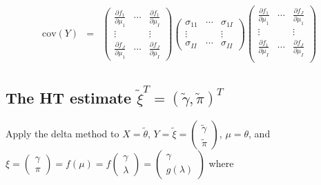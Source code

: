 \documentclass[11pt]{article}
\begin{document}
\begin{eqnarray}
\mbox{cov}(Y) & = & 
        \left( \begin{array}{lll}
            \frac{\partial f_1}{\partial \mu_1} & \cdots 
            & \frac{\partial f_1}{\partial \mu_I}\\
            \vdots & & \vdots\\
            \frac{\partial f_J}{\partial \mu_1} & \cdots
            & \frac{\partial f_J}{\partial \mu_I}
          \end{array} \right)
        \left( \begin{array} {lll}
            \sigma_{11} & \cdots & \sigma_{1I}\\
            \vdots & & \vdots\\
            \sigma_{II} & \cdots & \sigma_{II}
          \end{array} \right)
        \left( \begin{array} {lll}
            \frac{\partial f_1}{\partial \mu_1} & \cdots
            & \frac{\partial f_J}{\partial \mu_1}\\
            \vdots & & \vdots\\
            \frac{\partial f_1}{\partial \mu_I} & \cdots
            & \frac{\partial f_J}{\partial \mu_I}\\
          \end{array} \right)
      \end{eqnarray}

\subsection{The HT estimate $\tilde{\xi}^T = (\tilde{\gamma},
  \tilde{\pi})^T$ }
\label{sec:HT}

Apply the delta method to $X = \tilde{\theta}$, 
$Y = \tilde{\xi} = \begin{pmatrix}  \tilde{\gamma}\\
  \tilde{\pi}  \end{pmatrix}$, 
$\mu = \theta$,
and $\xi = \begin{pmatrix}  \gamma\\
  \pi  \end{pmatrix} = f(\mu) 
= f \begin{pmatrix}  \gamma\\
  \lambda  \end{pmatrix} = \begin{pmatrix}  \gamma\\
  g(\lambda)  \end{pmatrix}$
where
\end{document}
